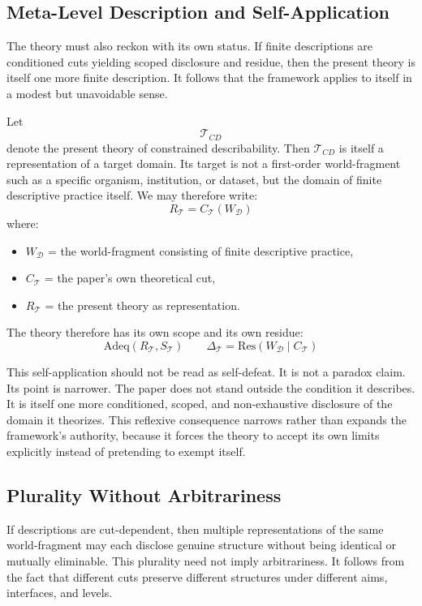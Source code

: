 \documentclass[11pt]{article}
\begin{document}
\subsection{Meta-Level Description and Self-Application}

The theory must also reckon with its own status. If finite descriptions are conditioned cuts yielding scoped disclosure and residue, then the present theory is itself one more finite description. It follows that the framework applies to itself in a modest but unavoidable sense.

Let
\[
\mathcal{T}_{CD}
\]
denote the present theory of constrained describability. Then \(\mathcal{T}_{CD}\) is itself a representation of a target domain. Its target is not a first-order world-fragment such as a specific organism, institution, or dataset, but the domain of finite descriptive practice itself. We may therefore write:
\[
R_{\mathcal{T}} = C_{\mathcal{T}}(W_{\mathcal{D}})
\]
where:
\begin{itemize}
    \item \(W_{\mathcal{D}}\) = the world-fragment consisting of finite descriptive practice,
    \item \(C_{\mathcal{T}}\) = the paper's own theoretical cut,
    \item \(R_{\mathcal{T}}\) = the present theory as representation.
\end{itemize}

The theory therefore has its own scope and its own residue:
\[
\mathrm{Adeq}(R_{\mathcal{T}},S_{\mathcal{T}})
\qquad
\Delta_{\mathcal{T}} = \mathrm{Res}(W_{\mathcal{D}} \mid C_{\mathcal{T}})
\]

This self-application should not be read as self-defeat. It is not a paradox claim. Its point is narrower. The paper does not stand outside the condition it describes. It is itself one more conditioned, scoped, and non-exhaustive disclosure of the domain it theorizes. This reflexive consequence narrows rather than expands the framework's authority, because it forces the theory to accept its own limits explicitly instead of pretending to exempt itself.

\subsection{Plurality Without Arbitrariness}

If descriptions are cut-dependent, then multiple representations of the same world-fragment may each disclose genuine structure without being identical or mutually eliminable. This plurality need not imply arbitrariness. It follows from the fact that different cuts preserve different structures under different aims, interfaces, and levels. \cite{chakravartty_scientific_realism_sep,ladyman_structural_realism_sep,scientific_pluralism_sep}
\end{document}
